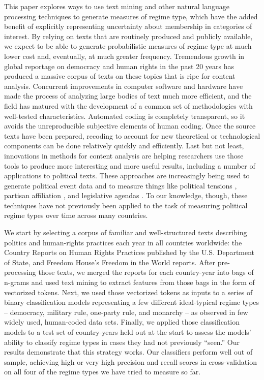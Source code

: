\documentclass[pdftex,12pt,fullpage,oneside]{amsart}
\begin{document}
This paper explores ways to use text mining and other natural language processing techniques to generate measures of regime type, which have the added benefit of explicitly representing uncertainty about membership in categories of interest. By relying on texts that are routinely produced and publicly available, we expect to be able to generate probabilistic measures of regime type at much lower cost and, eventually, at much greater frequency. Tremendous growth in global reportage on democracy and human rights in the past 20 years has produced a massive corpus of texts on these topics that is ripe for content analysis. Concurrent improvements in computer software and hardware have made the process of analyzing large bodies of text much more efficient, and the field has matured with the development of a common set of methodologies with well-tested characteristics. Automated coding is completely transparent, so it avoids the unreproducible subjective elements of human coding. Once the source texts have been prepared, recoding to account for new theoretical or technological components can be done relatively quickly and efficiently. Last but not least, innovations in methods for content analysis are helping researchers use those tools to produce more interesting and more useful results, including a number of applications to political texts. These approaches are increasingly being used to generate political event data \cite{dorazio:etal:2014,king:lowe:2003,oconnor:etal:2013} and to measure things like political tensions \cite{chadefaux:2014}, partisan affiliation \citep{slapin:proksch:2010,yu:etal:2008}, and legislative agendas \citep{grimmer:2010}. To our knowledge, though, these techniques have not previously been applied to the task of measuring political regime types over time across many countries.

We start by selecting a corpus of familiar and well-structured texts describing politics and human-rights practices each year in all countries worldwide: the Country Reports on Human Rights Practices published by the U.S. Department of State, and Freedom House's Freedom in the World reports. After pre-processing those texts, we merged the reports for each country-year into bags of n-grams and used text mining to extract features from those bags in the form of vectorized tokens. Next, we used those vectorized tokens as inputs to a series of binary classification models representing a few different ideal-typical regime types -- democracy, military rule, one-party rule, and monarchy -- as observed in few widely used, human-coded data sets. Finally, we applied those classification models to a test set of country-years held out at the start to assess the models' ability to classify regime types in cases they had not previously ``seen.'' Our results demonstrate that this strategy works. Our classifiers perform well out of sample, achieving high or very high precision and recall scores in cross-validation on all four of the regime types we have tried to measure so far. 
\end{document}
